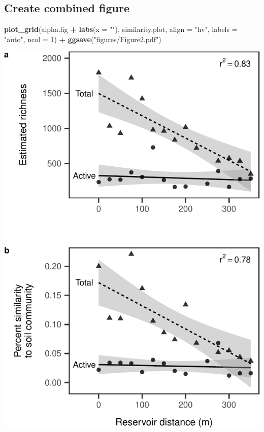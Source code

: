 \documentclass[]{article}
\newenvironment{Shaded}{\begin{snugshade}}{\end{snugshade}}
\newcommand{\DataTypeTok}[1]{\textcolor[rgb]{0.13,0.29,0.53}{#1}}
\newcommand{\DecValTok}[1]{\textcolor[rgb]{0.00,0.00,0.81}{#1}}
\newcommand{\KeywordTok}[1]{\textcolor[rgb]{0.13,0.29,0.53}{\textbf{#1}}}
\newcommand{\NormalTok}[1]{#1}
\newcommand{\OperatorTok}[1]{\textcolor[rgb]{0.81,0.36,0.00}{\textbf{#1}}}
\newcommand{\StringTok}[1]{\textcolor[rgb]{0.31,0.60,0.02}{#1}}
\begin{document}
\hypertarget{create-combined-figure}{%
\subsection{Create combined figure}\label{create-combined-figure}}

\begin{Shaded}
\begin{Highlighting}[]
\KeywordTok{plot_grid}\NormalTok{(alpha.fig }\OperatorTok{+}\StringTok{ }\KeywordTok{labs}\NormalTok{(}\DataTypeTok{x =} \StringTok{""}\NormalTok{), similarity.plot, }
          \DataTypeTok{align =} \StringTok{"hv"}\NormalTok{,}
          \DataTypeTok{labels =} \StringTok{"auto"}\NormalTok{, }\DataTypeTok{ncol =} \DecValTok{1}\NormalTok{) }\OperatorTok{+}
\StringTok{  }\KeywordTok{ggsave}\NormalTok{(}\StringTok{"figures/Figure2.pdf"}\NormalTok{)}
\end{Highlighting}
\end{Shaded}

\begin{center}\includegraphics{ReservoirGradient_files/figure-latex/combined-plots-1} \end{center}
\end{document}
